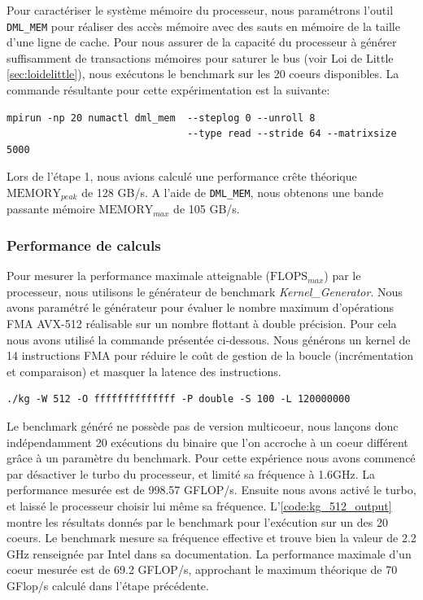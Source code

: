         Pour caractériser le système mémoire du processeur, nous paramétrons l'outil \verb=DML_MEM= pour réaliser des accès mémoire avec des sauts en mémoire de la taille d'une ligne de cache.
        Pour nous assurer de la capacité du processeur à générer suffisamment de transactions mémoires pour saturer le bus (voir Loi de Little \autoref{sec:loidelittle}), nous exécutons le benchmark sur les 20 coeurs disponibles. La commande résultante pour cette expérimentation est la suivante:
\begin{lstlisting}
mpirun -np 20 numactl dml_mem  --steplog 0 --unroll 8 
                               --type read --stride 64 --matrixsize 5000
\end{lstlisting}
        Lors de l'étape 1, nous avions calculé une performance crête théorique $\text{MEMORY}_{peak}$ de 128 GB/s. A l'aide de \verb=DML_MEM=, nous obtenons une bande passante mémoire $\text{MEMORY}_{max}$ de 105 GB/s.
        
    
    
    \subsubsection{Performance de calculs}
    
        Pour mesurer la performance maximale atteignable ($\text{FLOPS}_{max}$) par le processeur, nous utilisons le générateur de benchmark \textit{Kernel\_Generator}. Nous avons paramétré le générateur pour évaluer le nombre maximum d'opérations \gls{FMA} AVX-512 réalisable sur un nombre flottant à double précision. Pour cela nous avons utilisé la commande présentée ci-dessous. Nous générons un kernel de 14 instructions FMA pour réduire le coût de gestion de la boucle (incrémentation et comparaison) et masquer la latence des instructions.

\begin{lstlisting}
./kg -W 512 -O ffffffffffffff -P double -S 100 -L 120000000
\end{lstlisting}
        
        Le benchmark généré ne possède pas de version multicoeur, nous lançons donc indépendamment 20 exécutions du binaire que l'on accroche à un coeur différent grâce à un paramètre du benchmark. Pour cette expérience nous avons commencé par désactiver le turbo du processeur, et limité sa fréquence à 1.6GHz. La performance mesurée est de 998.57 GFLOP/s. Ensuite nous avons activé le turbo, et laissé le processeur choisir lui même sa fréquence. L'\autoref{code:kg_512_output} montre les résultats donnés par le benchmark pour l'exécution sur un des 20 coeurs. Le benchmark mesure sa fréquence effective et trouve bien la valeur de 2.2 GHz renseignée par Intel dans sa documentation. La performance maximale d'un coeur mesurée  est de 69.2 GFLOP/s, approchant le maximum théorique de 70 GFlop/s calculé dans l'étape précédente.
        
